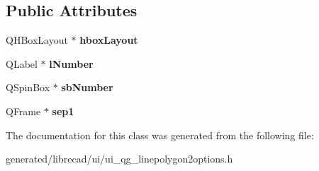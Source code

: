 \subsection*{Public Attributes}
\begin{DoxyCompactItemize}
\item 
\hypertarget{classUi__QG__LinePolygon2Options_a17fb17e6ee18987653251111066782f3}{Q\-H\-Box\-Layout $\ast$ {\bfseries hbox\-Layout}}\label{classUi__QG__LinePolygon2Options_a17fb17e6ee18987653251111066782f3}

\item 
\hypertarget{classUi__QG__LinePolygon2Options_a8753f4ec3c0b889745e7bc0927263cea}{Q\-Label $\ast$ {\bfseries l\-Number}}\label{classUi__QG__LinePolygon2Options_a8753f4ec3c0b889745e7bc0927263cea}

\item 
\hypertarget{classUi__QG__LinePolygon2Options_abd77fb28d40b48220457432e84c2a5bc}{Q\-Spin\-Box $\ast$ {\bfseries sb\-Number}}\label{classUi__QG__LinePolygon2Options_abd77fb28d40b48220457432e84c2a5bc}

\item 
\hypertarget{classUi__QG__LinePolygon2Options_a672d7b570daac7e4fe67639419fa93ec}{Q\-Frame $\ast$ {\bfseries sep1}}\label{classUi__QG__LinePolygon2Options_a672d7b570daac7e4fe67639419fa93ec}

\end{DoxyCompactItemize}


The documentation for this class was generated from the following file\-:\begin{DoxyCompactItemize}
\item 
generated/librecad/ui/ui\-\_\-qg\-\_\-linepolygon2options.\-h\end{DoxyCompactItemize}
